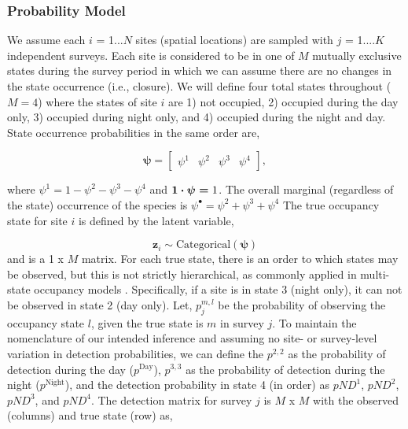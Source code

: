 \documentclass[12pt]{article}
\begin{document}
\subsubsection{Probability Model}
We assume each $i$ = 1...$N$ sites (spatial locations) are sampled with $j$ = 1....$K$ independent surveys. Each site is considered to be in one of $M$ mutually exclusive states during the survey period in which we can assume there are no changes in the state occurrence (i.e., closure). We will define four total states throughout ($M = 4$) where the states of site $i$ are 1) not occupied, 2) occupied during the day only, 3) occupied during night only, and 4) occupied during the night and day. State occurrence probabilities in the same order are, 

\begin{equation}
\boldsymbol{\psi} = \begin{bmatrix} \psi^1 & \psi^2 & \psi^3 & \psi^4 \end{bmatrix}, %
\end{equation}

where  $\psi^{1} = 1 - \psi^{2} - \psi^{3} - \psi^{4}$ and $\boldmath{1} \cdot \boldsymbol{\psi} = \text{1}$. The overall marginal (regardless of the state) occurrence of the species is $\psi^{\bullet} = \psi^{2} + \psi^{3} + \psi^{4}$ The true occupancy state for site $i$ is defined by the latent variable,

\begin{equation}
\textbf{z}_{i} \sim \text{Categorical}(\boldsymbol{\psi})
\end{equation}
and is a 1 x $M$ matrix. For each true state, there is an order to which states may be observed, but this is not strictly hierarchical, as commonly applied in multi-state occupancy models \citep{nichols2007}. Specifically, if a site is in state 3 (night only), it can not be observed in state 2 (day only). Let,  $p^{m,l}_{j}$ be the probability of observing the occupancy state $l$, given the true state is $m$ in survey $j$. To maintain the nomenclature of our intended inference and assuming no site- or survey-level variation in detection probabilities, we can define the $p^{2,2}$ as the probability of detection during the day ($p^{\text{Day}}$), $p^{3,3}$ as the probability of detection during the night ($p^{\text{Night}}$), and the detection probability in state 4 (in order) as $pND^{1}$, $pND^{2}$, $pND^{3}$, and $pND^{4}$. The detection matrix for survey $j$ is $M$ x $M$ with the observed (columns) and true state (row) as,
\end{document}
